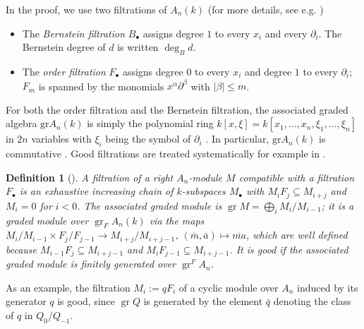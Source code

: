 \documentclass[pdflatex,sn-mathphys-num]{sn-jnl}
\numberwithin{equation}{section}
\theoremstyle{thmstyleone}
\newtheorem{definition}[theorem]{Definition}
\theoremstyle{thmstyletwo}
\newcommand{\gr}{\operatorname{gr}}
\begin{document}
In the proof, we use two filtrations of $A_n(k)$ (for more details, see e.g. \cite[Chapter 7]{coutinho})
\begin{itemize}[nosep,leftmargin=1.4em]
\item The \emph{Bernstein filtration} $B_\bullet$ assigns degree $1$ to every
  $x_i$ and every $\partial_i$. The Bernstein degree of $d$ is
  written $\deg_B d$.
\item The \emph{order filtration} $F_\bullet$ assigns degree $0$ to every $x_i$
  and degree $1$ to every $\partial_i$; $F_m$ is spanned by the monomials
  $x^\alpha\partial^\beta$ with $|\beta|\le m$.  %
\end{itemize}
For both the order filtration and the Bernstein filtration, the associated graded algebra $\mathrm{gr} A_n(k)$ is simply the polynomial ring $k[x,\xi]=k[x_1,\dots,x_n,\xi_1,\dots,\xi_n]$ in $2n$ variables with $\xi_i$ being the symbol of $\partial_i$ \cite[Th. 7.3.1]{coutinho}. In particular, $\mathrm{gr} A_n(k)$ is commutative \cite[Prop.~2.10]{SchnellNotes}.
Good filtrations are treated systematically for example in \cite{Bjork,HTT}. 

\begin{definition}[{\cite[Ch. 8.3]{coutinho}}]\label{def:good-filtration}
A filtration of a right $A_n$-module $M$ compatible with a filtration $F_\bullet$
is an exhaustive increasing chain of $k$-subspaces $M_\bullet$ with
$M_iF_j\subseteq M_{i+j}$ and $M_i=0$ for $i<0$. The associated graded module is $\operatorname{gr}M=\bigoplus_iM_i/M_{i-1}$; it is a graded module over $\operatorname{gr}_FA_n(k)$ via the maps
$M_i/M_{i-1}\times F_j/F_{j-1}\to M_{i+j}/M_{i+j-1}$, $(\bar m,\bar a)\mapsto\overline{ma}$,
which are well defined because $M_{i-1}F_j\subseteq M_{i+j-1}$ and $M_iF_{j-1}\subseteq M_{i+j-1}$.
It is \emph{good} if the associated graded module is finitely generated over $\gr^FA_n$.
\end{definition}
As an example, the filtration $M_i:=qF_i$ of a cyclic module over $A_n$ induced by its generator $q$ is good, since $\gr Q$ is generated by the element $\bar{q}$ denoting the class of $q$ in $Q_0/Q_{-1}.$
\end{document}
